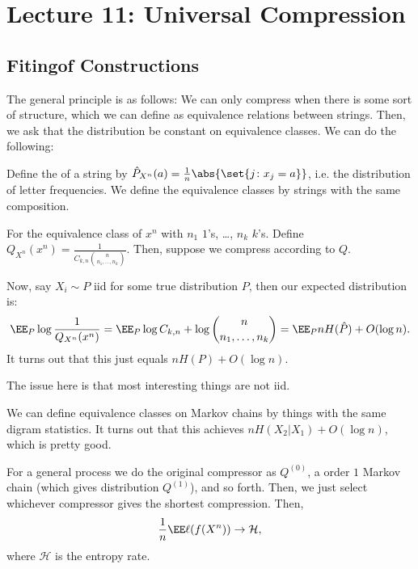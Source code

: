 \section*{Lecture 11: Universal Compression}
\setcounter{section}{11}

\subsection{Fitingof Constructions}

The general principle is as follows: We can only compress when there is some sort of structure, which we can define as equivalence relations between strings. Then, we ask that the distribution be constant on equivalence classes.
We can do the following:

\begin{exm}
	Define the  of a string by $\hat P_{X^n}(a) = \frac 1n \abs{\set{j\colon x_j= a}}$, i.e. the distribution of letter frequencies. 
	We define the equivalence classes by strings with the same composition. 

	For the equivalence class of $x^n$ with $n_1$ $1$'s, \ldots, $n_k$ $k$'s. Define $Q_{X^n}(x^n) = \frac{1}{C_{k,n}\binom{n}{n_1,\ldots, n_k}}$. 
	Then, suppose we compress according to $Q$.

	Now, say $X_i\sim P$ iid for some true distribution $P$, then our expected distribution is: \[
		\EE_P \log \frac{1}{Q_{X^n}(x^n)} = \EE_P \log C_{k,n} + \log \binom{n}{n_1, \ldots, n_k} = \EE_P nH(\hat P) + O(\log n).
	\]
	It turns out that this just equals $nH(P) + O(\log n)$.
\end{exm}

The issue here is that most interesting things are not iid. 

\begin{exm}
	We can define equivalence classes on Markov chains by things with the same digram statistics. It turns out that this achieves $nH(X_2|X_1) + O(\log n)$, which is pretty good.
\end{exm}

\begin{thm}
	For a general process we do the original compressor as $Q^{(0)}$, a order $1$ Markov chain (which gives distribution $Q^{(1)}$), and so forth. Then, we just select whichever compressor gives the shortest compression.
	Then, \[
		\frac 1n \EE \ell (f(X^n)) \to \mathcal H,
	\]
	where $\mathcal H$ is the entropy rate.
\end{thm}

